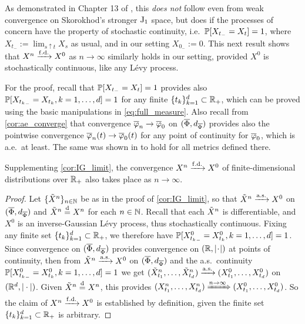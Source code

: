 As demonstrated in Chapter 13 of \cite{billingsley_1999}, this \emph{does not} follow even from weak convergence on Skorokhod's stronger $\mathrm{J}_1$ space, but does if the processes of concern have the property of stochastic continuity, i.e.~$\mathbb{P}[X_{t_-}= X_t]=1$, where $X_{t_-}:=\lim_{s\uparrow t}X_s$ as usual, and in our setting $X_{0_-}:=0$. This next result shows that $X^n\xrightarrow{\mathrm{f.d.}} X^0$ as $n\to\infty$ similarly holds in our setting, provided $X^0$ is stochastically continuous, like any L\'evy process.

For the proof, recall that $\mathbb{P}[X_{t_-}= X_t]=1$ provides also $\mathbb{P}[X_{{t_k}_-}= X_{t_k},k=1,\dots,d]=1$ for any finite $\{t_k\}_{k=1}^d\subset\mathbb{R}_+$, which can be proved using the basic manipulations in \autoref{eq:full_measure}. Also recall from \autoref{cor:ae_converge} that convergence $\overline{\varphi}_n\to\overline{\varphi}_0$ on $(\overline{\Phi},d_{\overline{\Phi}})$ provides also the pointwise convergence $\overline{\varphi}_n(t)\to\overline{\varphi}_0(t)$ for any point of continuity for $\overline{\varphi}_0$, which is a.e.~at least. The same was shown in \cite{skorokhod_1956} to hold for all metrics defined there.

\begin{corollary}\label{cor:IG_limit_fd}
    Supplementing \autoref{cor:IG_limit}, the convergence $X^n\xrightarrow{\mathrm{f.d.}} X^0$ of finite-dimensional distributions over $\mathbb{R}_+$ also takes place as $n\to\infty$.
\end{corollary}
\begin{proof}
    Let $\{\tilde{X}^n\}_{n\in\mathbb{N}}$ be as in the proof of \autoref{cor:IG_limit}, so that $\tilde{X}^n \xrightarrow{\mathrm{a.s.}} X^0$ on $(\overline{\Phi},d_{\overline{\Phi}})$ and $\tilde{X}^n\stackrel{\mathrm{d}}{=} X^n$ for each $n\in\mathbb{N}$. Recall that each $\tilde{X}^n$ is differentiable, and $X^0$ is an inverse-Gaussian L\'evy process, thus stochastically continuous. Fixing any finite set $\{t_k\}_{k=1}^d\subset\mathbb{R}_+$, we therefore have $\mathbb{P}[X^0_{{t_k}_-}= X^0_{t_k},k=1,\dots,d]=1$.  Since convergence on $(\overline{\Phi},d_{\overline{\Phi}})$ provides convergence on $(\mathbb{R},|\!\cdot\!|)$ at points of continuity, then from $\tilde{X}^n \xrightarrow{\mathrm{a.s.}} X^0$ on $(\overline{\Phi},d_{\overline{\Phi}})$ and the a.s.~continuity $\mathbb{P}[X^0_{{t_k}_-}= X^0_{t_k},k=1,\dots,d]=1$ we get $(\tilde{X}^n_{t_1},\dots,\tilde{X}^n_{t_d})\xrightarrow{\mathrm{a.s.}}(X^0_{t_1},\dots,X^0_{t_d})$ on $(\mathbb{R}^d,|\cdot|)$. Given $\tilde{X}^n\stackrel{\mathrm{d}}{=} X^n$, this provides $(X^n_{t_1},\dots,X^n_{t_d})\xRightarrow{n\to\infty}(X^0_{t_1},\dots,X^0_{t_d})$. So the claim of $X^n\xrightarrow{\mathrm{f.d.}} X^0$ is established by definition, given the finite set $\{t_k\}_{k=1}^d\subset\mathbb{R}_+$ is arbitrary.
\end{proof}

